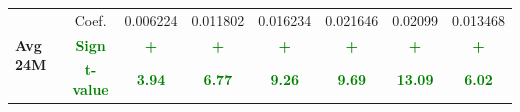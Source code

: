 \documentclass[11pt,english,a4paper,hidelinks]{book}
\begin{document}
\begin{table}[H]
\begin{tabular}{lccccccc}
        \cmidrule{1-8}
        \multirow{3}{*}{\textbf{Avg 24M}}
            & Coef.   & 0.006224  & 0.011802  & 0.016234  & 0.021646  & 0.02099   & 0.013468  \\
            & \textbf{\textcolor{green}{Sign}}
                     & \textbf{\textcolor{green}{+}}
                     & \textbf{\textcolor{green}{+}}
                     & \textbf{\textcolor{green}{+}}
                     & \textbf{\textcolor{green}{+}}
                     & \textbf{\textcolor{green}{+}}
                     & \textbf{\textcolor{green}{+}} \\
            & \textbf{\textcolor{green}{t-value}}
                     & \textbf{\textcolor{green}{3.94}}
                     & \textbf{\textcolor{green}{6.77}}
                     & \textbf{\textcolor{green}{9.26}}
                     & \textbf{\textcolor{green}{9.69}}
                     & \textbf{\textcolor{green}{13.09}}
                     & \textbf{\textcolor{green}{6.02}} \\
        \bottomrule
    \end{tabular}
    \label{tab:growth_windowed_reformat}
\end{table}
\end{document}
